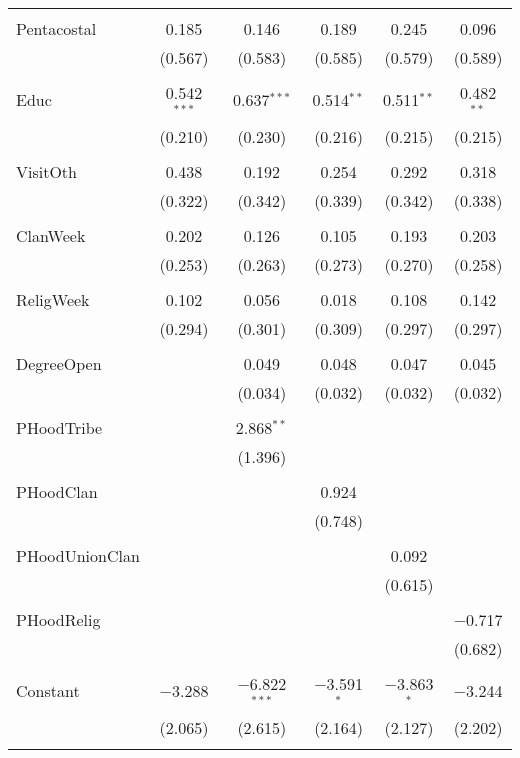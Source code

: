 \begin{table}[!htbp]
\begin{tabular}{@{\extracolsep{5pt}}lccccc}
  & & & & & \\ 
 Pentacostal & 0.185 & 0.146 & 0.189 & 0.245 & 0.096 \\ 
  & (0.567) & (0.583) & (0.585) & (0.579) & (0.589) \\ 
  & & & & & \\ 
 Educ & 0.542$^{***}$ & 0.637$^{***}$ & 0.514$^{**}$ & 0.511$^{**}$ & 0.482$^{**}$ \\ 
  & (0.210) & (0.230) & (0.216) & (0.215) & (0.215) \\ 
  & & & & & \\ 
 VisitOth & 0.438 & 0.192 & 0.254 & 0.292 & 0.318 \\ 
  & (0.322) & (0.342) & (0.339) & (0.342) & (0.338) \\ 
  & & & & & \\ 
 ClanWeek & 0.202 & 0.126 & 0.105 & 0.193 & 0.203 \\ 
  & (0.253) & (0.263) & (0.273) & (0.270) & (0.258) \\ 
  & & & & & \\ 
 ReligWeek & 0.102 & 0.056 & 0.018 & 0.108 & 0.142 \\ 
  & (0.294) & (0.301) & (0.309) & (0.297) & (0.297) \\ 
  & & & & & \\ 
 DegreeOpen &  & 0.049 & 0.048 & 0.047 & 0.045 \\ 
  &  & (0.034) & (0.032) & (0.032) & (0.032) \\ 
  & & & & & \\ 
 PHoodTribe &  & 2.868$^{**}$ &  &  &  \\ 
  &  & (1.396) &  &  &  \\ 
  & & & & & \\ 
 PHoodClan &  &  & 0.924 &  &  \\ 
  &  &  & (0.748) &  &  \\ 
  & & & & & \\ 
 PHoodUnionClan &  &  &  & 0.092 &  \\ 
  &  &  &  & (0.615) &  \\ 
  & & & & & \\ 
 PHoodRelig &  &  &  &  & $-$0.717 \\ 
  &  &  &  &  & (0.682) \\ 
  & & & & & \\ 
 Constant & $-$3.288 & $-$6.822$^{***}$ & $-$3.591$^{*}$ & $-$3.863$^{*}$ & $-$3.244 \\ 
  & (2.065) & (2.615) & (2.164) & (2.127) & (2.202) \\ 
  & & & & & \\ 

\end{tabular}
\end{table}

